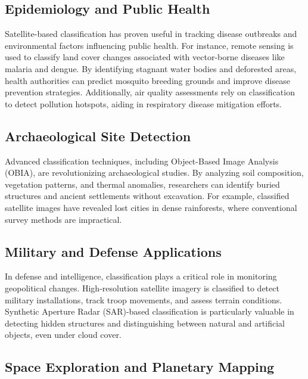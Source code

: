 \documentclass[
  letterpaper,
]{scrbook}
\begin{document}
\subsection{\texorpdfstring{\textbf{Epidemiology and Public
Health}}{Epidemiology and Public Health}}\label{epidemiology-and-public-health}

Satellite-based classification has proven useful in tracking disease
outbreaks and environmental factors influencing public health. For
instance, remote sensing is used to classify land cover changes
associated with vector-borne diseases like malaria and dengue. By
identifying stagnant water bodies and deforested areas, health
authorities can predict mosquito breeding grounds and improve disease
prevention strategies. Additionally, air quality assessments rely on
classification to detect pollution hotspots, aiding in respiratory
disease mitigation efforts.

\subsection{\texorpdfstring{\textbf{Archaeological Site
Detection}}{Archaeological Site Detection}}\label{archaeological-site-detection}

Advanced classification techniques, including Object-Based Image
Analysis (OBIA), are revolutionizing archaeological studies. By
analyzing soil composition, vegetation patterns, and thermal anomalies,
researchers can identify buried structures and ancient settlements
without excavation. For example, classified satellite images have
revealed lost cities in dense rainforests, where conventional survey
methods are impractical.

\subsection{\texorpdfstring{\textbf{Military and Defense
Applications}}{Military and Defense Applications}}\label{military-and-defense-applications}

In defense and intelligence, classification plays a critical role in
monitoring geopolitical changes. High-resolution satellite imagery is
classified to detect military installations, track troop movements, and
assess terrain conditions. Synthetic Aperture Radar (SAR)-based
classification is particularly valuable in detecting hidden structures
and distinguishing between natural and artificial objects, even under
cloud cover.

\subsection{\texorpdfstring{\textbf{Space Exploration and Planetary
Mapping}}{Space Exploration and Planetary Mapping}}\label{space-exploration-and-planetary-mapping}
\end{document}
